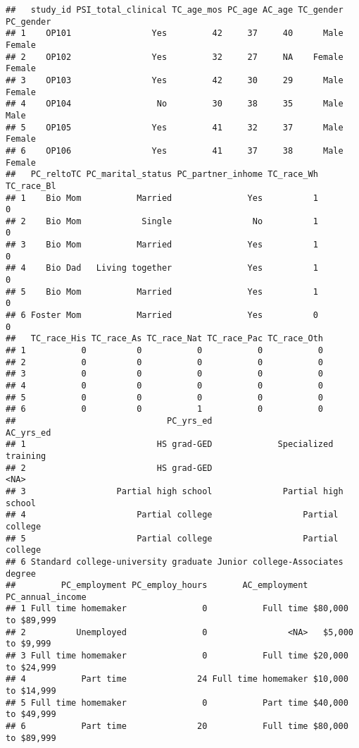 \documentclass[
]{article}
\begin{document}
\begin{verbatim}
##   study_id PSI_total_clinical TC_age_mos PC_age AC_age TC_gender PC_gender
## 1    OP101                Yes         42     37     40      Male    Female
## 2    OP102                Yes         32     27     NA    Female    Female
## 3    OP103                Yes         42     30     29      Male    Female
## 4    OP104                 No         30     38     35      Male      Male
## 5    OP105                Yes         41     32     37      Male    Female
## 6    OP106                Yes         41     37     38      Male    Female
##   PC_reltoTC PC_marital_status PC_partner_inhome TC_race_Wh TC_race_Bl
## 1    Bio Mom           Married               Yes          1          0
## 2    Bio Mom            Single                No          1          0
## 3    Bio Mom           Married               Yes          1          0
## 4    Bio Dad   Living together               Yes          1          0
## 5    Bio Mom           Married               Yes          1          0
## 6 Foster Mom           Married               Yes          0          0
##   TC_race_His TC_race_As TC_race_Nat TC_race_Pac TC_race_Oth
## 1           0          0           0           0           0
## 2           0          0           0           0           0
## 3           0          0           0           0           0
## 4           0          0           0           0           0
## 5           0          0           0           0           0
## 6           0          0           1           0           0
##                              PC_yrs_ed                        AC_yrs_ed
## 1                          HS grad-GED             Specialized training
## 2                          HS grad-GED                             <NA>
## 3                  Partial high school              Partial high school
## 4                      Partial college                  Partial college
## 5                      Partial college                  Partial college
## 6 Standard college-university graduate Junior college-Associates degree
##         PC_employment PC_employ_hours       AC_employment   PC_annual_income
## 1 Full time homemaker               0           Full time $80,000 to $89,999
## 2          Unemployed               0                <NA>   $5,000 to $9,999
## 3 Full time homemaker               0           Full time $20,000 to $24,999
## 4           Part time              24 Full time homemaker $10,000 to $14,999
## 5 Full time homemaker               0           Part time $40,000 to $49,999
## 6           Part time              20           Full time $80,000 to $89,999

\end{verbatim}
\end{document}
